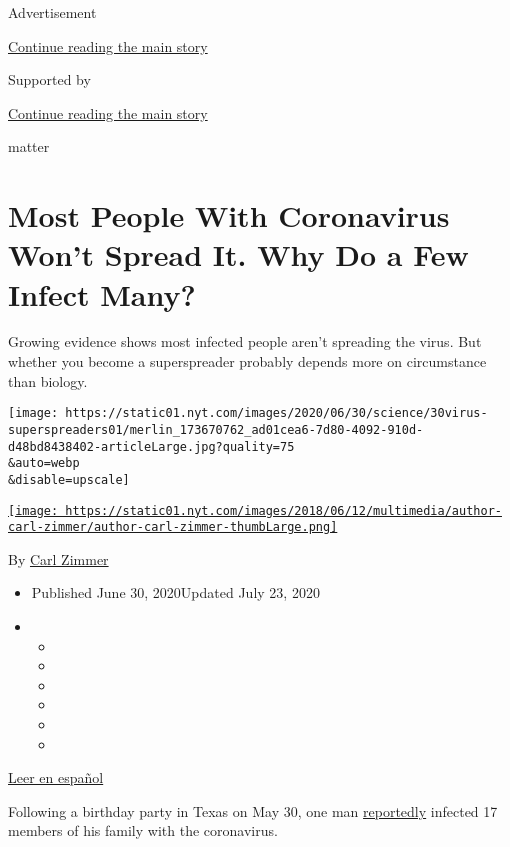 Advertisement

\protect\hyperlink{after-top}{Continue reading the main story}

Supported by

\protect\hyperlink{after-sponsor}{Continue reading the main story}

matter

\hypertarget{most-people-with-coronavirus-wont-spread-it-why-do-a-few-infect-many}{%
\section{Most People With Coronavirus Won't Spread It. Why Do a Few
Infect
Many?}\label{most-people-with-coronavirus-wont-spread-it-why-do-a-few-infect-many}}

Growing evidence shows most infected people aren't spreading the virus.
But whether you become a superspreader probably depends more on
circumstance than biology.

\texttt{[image: https://static01.nyt.com/images/2020/06/30/science/30virus-superspreaders01/merlin\_173670762\_ad01cea6-7d80-4092-910d-d48bd8438402-articleLarge.jpg?quality=75\\\&auto=webp\\\&disable=upscale]}

\href{https://www.nytimes.com/by/carl-zimmer}{\texttt{[image: https://static01.nyt.com/images/2018/06/12/multimedia/author-carl-zimmer/author-carl-zimmer-thumbLarge.png]}}

By \href{https://www.nytimes.com/by/carl-zimmer}{Carl Zimmer}

\begin{itemize}
\item
  Published June 30, 2020Updated July 23, 2020
\item
  \begin{itemize}
  \item
  \item
  \item
  \item
  \item
  \item
  \end{itemize}
\end{itemize}

\href{https://www.nytimes.com/es/2020/07/03/espanol/el-misterio-de-los-superpropagadores-de-coronavirus.html}{Leer
en español}

Following a birthday party in Texas on May 30, one man
\href{https://apnews.com/d9a6ca7eef083315648003509d07515a}{reportedly}
infected 17 members of his family with the coronavirus.


